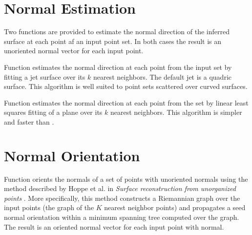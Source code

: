 \section{Normal Estimation}

Two functions are provided to estimate the normal direction of the inferred surface at each point af an input point set. In both cases the result is an unoriented normal vector for each input point.

Function  estimates the normal direction at each point from the input set by fitting a jet surface over its $k$ nearest neighbors. The default jet is a quadric surface. This algorithm is well suited to point sets scattered over curved surfaces.

Function  estimates the normal direction at each point from the set by linear least squares fitting of a plane over its $k$ nearest neighbors. This algorithm is simpler and faster than .


\section{Normal Orientation}

Function  orients the normals of a set of points with unoriented normals using the method described by Hoppe et al. in \emph{Surface reconstruction from unorganized points} \cite{cgal:hddms-srup-92}. More specifically, this method constructs a Riemannian graph over the input points (the graph of the $K$ nearest neighbor points) and propagates a seed normal orientation within a minimum spanning tree computed over the graph. The result is an oriented normal vector for each input point with normal.


